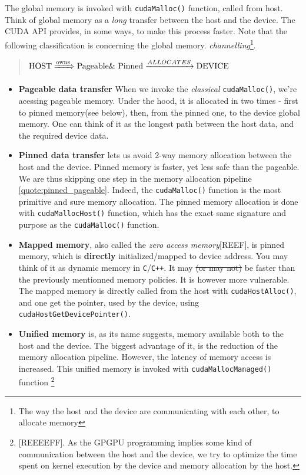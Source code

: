 \documentclass[12pt]{article}
\begin{document}
The global memory is invoked with \verb|cudaMalloc()| function, called from host. Think of 
global memory as a \textit{long} transfer between the host and the device. 
The CUDA API provides, in some ways, to make this process faster. Note that the following classification is 
concerning the global memory. \textit{channelling}\footnote{The way the host and the device are 
communicating with each other, to allocate memory}.

\begin{quote}
   $\text{HOST}\xRightarrow{\text{owns}}\text{Pageable\& Pinned} \xrightarrow{ALLOCATES}\text{DEVICE}$
   \label{quote:pinned_pageable}
\end{quote}


\begin{itemize}
   \setlength\itemsep{-0.5em}

   \item \textbf{Pageable data transfer} When we invoke the \textit{classical} \verb|cudaMalloc()|, 
   we're acessing pageable memory. Under the hood, it is allocated in two times - first to pinned memory(see below), 
   then, from the pinned one, to the device global memory. One can think of it as the longest path between the host data, 
   and the required device data.
   \item \textbf{Pinned data transfer} lets us avoid 2-way memory allocation between the host and the device. 
   Pinned memory is faster, yet less safe than the pageable. We are thus skipping one step in the memory allocation 
   pipeline \ref{quote:pinned_pageable}. Indeed, the \verb|cudaMalloc()| function is the most 
   primitive and sure memory allocation. The pinned memory allocation is done with \verb|cudaMallocHost()| function, 
   which has the exact same signature and purpose as the \verb|cudaMalloc()| function.
   \item \textbf{Mapped memory}, also called the \textit{zero access memory}[REEF], is pinned memory, which is \textbf{directly}
   initialized/mapped to device address. You may think of it as dynamic memory in \verb|C|/\verb|C++|. It may \sout{(or may not)} be 
   faster than the previously mentionned memory policies. It is however more vulnerable. The mapped memory is directly called from the host 
   with \verb|cudaHostAlloc()|, and one get the pointer, used by the device, using \verb|cudaHostGetDevicePointer()|.
   \item \textbf{Unified memory} is, as its name suggests, memory available both to the host and the device. The biggest advantage of it, 
   is the reduction of the memory allocation pipeline. However, the latency of memory access is increased. This unified memory 
   is invoked with \verb|cudaMallocManaged()| function \footnote{[REEEEFF]. As the GPGPU programming implies some kind of communication 
   between the host and the device, we try to optimize the time spent on kernel execution by the device and memory allocation by the host.}

   \label{mem_alloc}

\end{itemize}
\end{document}
